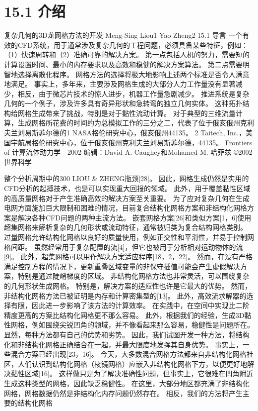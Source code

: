 \documentclass[UTF8,11pt,a4paper,openany,fontset=fandol]{ctexbook}
\begin{document}
\section{15.1 介绍}
复杂几何的3D龙网格方法的开发 Meng-Sing Liou1 Yao Zheng2 15.1 导言 一个有效的CFD系统，用于通常涉及复杂几何的工程问题，必须具备某些特征，例如：（1）快速周转和（2）准确可靠的解决方案。 第一点包括人机的努力，需要短的计算设置时间、最小的内存要求以及高效和稳健的解决方案算法。 第二点需要明智地选择离散化程序。 网格方法的选择将极大地影响上述两个标准是否令人满意地满足。 事实上，多年来，主要涉及网格生成的大部分人力工作量没有显著减少，相反，由于微芯片技术的惊人进步，机器工作量急剧减少。 推进系统是复杂几何的一个例子，涉及许多具有奇异形状和急转弯的独立几何实体。 这种拓扑结构给网格生成带来了挑战，特别是对于黏性流动计算。 对于典型的三维流量计算，生成网格所花费的时间约为总模拟工作的三分之二，代表了位于俄亥俄州克利夫兰刘易斯菲尔德的1 NASA格伦研究中心，俄亥俄州44135。 2 Taitech, Inc.，美国宇航局格伦研究中心，位于俄亥俄州克利夫兰刘易斯菲尔德，44135。 Frontiers of 计算流体动力学 - 2002 编辑：David A. Caughey和Mohamed M. 哈菲兹 ©2002 世界科学

整个分析周期中的300 LIOU \& ZHENG瓶颈[28]。 因此，网格生成仍然是实用的CFD分析的起搏技术，也是可以实现重大回报的领域。 此外，用于覆盖黏性区域的高质量网格对于产生准确高效的解决方案至关重要。 为了应对复杂几何在生成电网方面施加巨大限制和困难的情况，目前复合结构化网格方案和非结构化网格方案是解决各种CFD问题的两种主流方法。 嵌套网格方案[26]和类似方案[1，6]使用超集网格来解析复杂的几何形状或流动特征，通常被归类为复合结构网格类别。 过量网格允许结构化网格以良好的质量使用，例如正交性和平滑性，并易于控制网格间距。 虽然经常用于复杂配置的流[4]，但它也被用于分析相对运动物体的流[9]。 此外，超集网格可以用作解决方案适应程序[18，2，22]。 然而，在没有严格满足控制方程的情况下，更新重叠区域变量的非保守插值可能会产生虚假解决方案，特别是通过陡峭梯度的区域。 非结构化网格方法也非常灵活，可以围绕复杂的几何形状生成网格。 特别是，解决方案的适应性也许是它最大的优势。 然而，非结构化网格方法已被证明是内存和计算密集型的[13]。 此外，高效流求解器的选择有限，因此进一步影响了该方法的计算效率。 在实践中，在空间中实现比二阶精度更高的方案比结构化网格更不那么容易。 此外，根据我们的经验，生成3D黏性网格，例如围绕尖锐凹角的领域，并不像看起来那么容易，稳健性是问题所在。 显然，每种方法都有自己的优势和劣势。 因此，我们试图开发一种方法，将结构化和非结构化网格正确结合在一起，并最大限度地发挥其自身优势。 事实上，一些混合方案已经出现[23，16]。 今天，大多数混合网格方法都来自非结构化网格社区，人们认识到结构化网格（棱镜网格）应嵌入非结构化网格下方，以便更好地解决黏性区域[16]。 这样做只是为了解决准确性问题，但事实上，它很难在凹角附近生成这种类型的网格，因此缺乏稳健性。 在这里，大部分地区都充满了非结构化网格，网格数据仍然是非结构化内存问题仍然存在。 相反，我们的方法将产生主要的结构化网格
\end{document}
